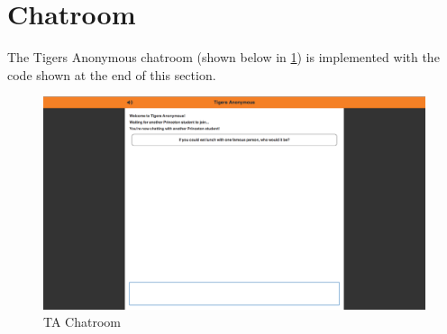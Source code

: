 \lstset{language=HTML}


\section{Chatroom}

The Tigers Anonymous chatroom (shown below in \ref{fig:TAChatRoom}) is implemented with the code shown at the end of this section.

\begin{figure}[h]
\centering
\includegraphics[trim= 35mm 0mm 35mm 0mm, clip, scale=0.25]{./Figures/TAChatroom}
\caption{TA Chatroom}
\label{fig:TAChatRoom}
\end{figure}

\lstset{language=HTML}

